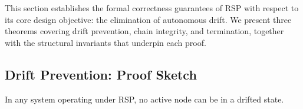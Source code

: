 This section establishes the formal correctness guarantees of RSP with respect to its core design objective: the elimination of autonomous drift. We present three theorems covering drift prevention, chain integrity, and termination, together with the structural invariants that underpin each proof.

\subsection{Drift Prevention: Proof Sketch}

\begin{thrm}
\label{thrm:drift-prevention}
In any \bxthree system operating under RSP, no active node can be in a drifted state.
\end{thrm}


